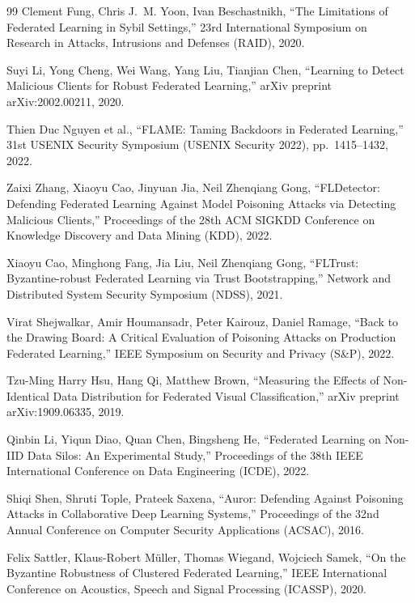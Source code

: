 \documentclass[a4j, dvipdfmx]{jsarticle}  %
\begin{document}
\begin{thebibliography}{99}
Clement Fung, Chris J.~M. Yoon, Ivan Beschastnikh,
``The Limitations of Federated Learning in Sybil Settings,''
23rd International Symposium on Research in Attacks, Intrusions and Defenses (RAID), 2020.

Suyi Li, Yong Cheng, Wei Wang, Yang Liu, Tianjian Chen,
``Learning to Detect Malicious Clients for Robust Federated Learning,''
arXiv preprint arXiv:2002.00211, 2020.

Thien Duc Nguyen et al.,
``FLAME: Taming Backdoors in Federated Learning,''
31st USENIX Security Symposium (USENIX Security 2022), pp.~1415--1432, 2022.

Zaixi Zhang, Xiaoyu Cao, Jinyuan Jia, Neil Zhenqiang Gong,
``FLDetector: Defending Federated Learning Against Model Poisoning Attacks via Detecting Malicious Clients,''
Proceedings of the 28th ACM SIGKDD Conference on Knowledge Discovery and Data Mining (KDD), 2022.

Xiaoyu Cao, Minghong Fang, Jia Liu, Neil Zhenqiang Gong,
``FLTrust: Byzantine-robust Federated Learning via Trust Bootstrapping,''
Network and Distributed System Security Symposium (NDSS), 2021.

Virat Shejwalkar, Amir Houmansadr, Peter Kairouz, Daniel Ramage,
``Back to the Drawing Board: A Critical Evaluation of Poisoning Attacks on Production Federated Learning,''
IEEE Symposium on Security and Privacy (S\&P), 2022.

Tzu-Ming Harry Hsu, Hang Qi, Matthew Brown,
``Measuring the Effects of Non-Identical Data Distribution for Federated Visual Classification,''
arXiv preprint arXiv:1909.06335, 2019.

Qinbin Li, Yiqun Diao, Quan Chen, Bingsheng He,
``Federated Learning on Non-IID Data Silos: An Experimental Study,''
Proceedings of the 38th IEEE International Conference on Data Engineering (ICDE), 2022.

Shiqi Shen, Shruti Tople, Prateek Saxena,
``Auror: Defending Against Poisoning Attacks in Collaborative Deep Learning Systems,''
Proceedings of the 32nd Annual Conference on Computer Security Applications (ACSAC), 2016.

Felix Sattler, Klaus-Robert M\"uller, Thomas Wiegand, Wojciech Samek,
``On the Byzantine Robustness of Clustered Federated Learning,''
IEEE International Conference on Acoustics, Speech and Signal Processing (ICASSP), 2020.


\end{thebibliography}
\end{document}
